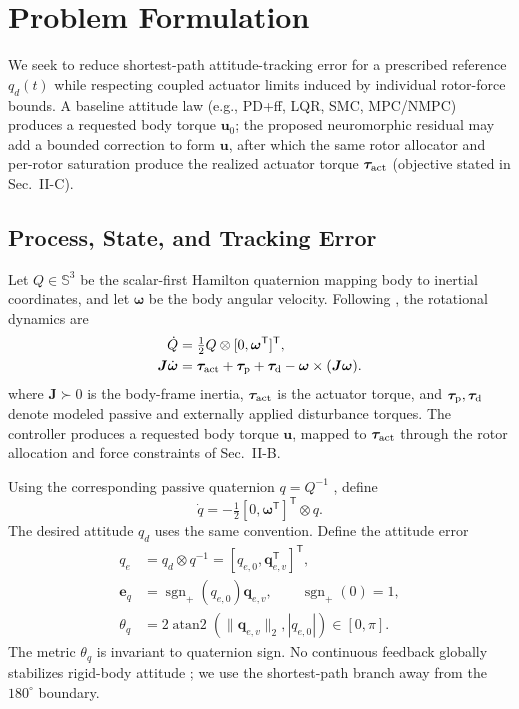 \documentclass[letterpaper, 10 pt, conference]{ieeeconf}
\newcommand{\T}{^{\mathsf T}}
\newcommand{\sgnp}{\operatorname{sgn}_{+}}
\begin{document}
\section{Problem Formulation}
\label{sec:problem}
We seek to reduce shortest-path attitude-tracking error for a prescribed reference $q_d(t)$ while respecting coupled actuator limits induced by individual rotor-force bounds. A baseline attitude law (e.g., PD+ff, LQR, SMC, MPC/NMPC) produces a requested body torque $\bm u_0$; the proposed neuromorphic residual may add a bounded correction to form $\bm u$, after which the same rotor allocator and per-rotor saturation produce the realized actuator torque $\bm\tau_{\rm act}$ (objective stated in Sec.~II-C).

\subsection{Process, State, and Tracking Error}

Let $Q\in\mathbb S^3$ be the scalar-first Hamilton quaternion mapping body to
inertial coordinates, and let $\bm\omega$ be the body angular velocity. Following \cite{schaub2018amss}, the
rotational dynamics are
\begin{align}
 \dot Q&=\tfrac12 Q\otimes[0,\bm\omega\T]\T,\\
 \bm J\dot{\bm\omega}&=\bm\tau_{\rm act}+\bm\tau_{\rm p}
       +\bm\tau_{\rm d}-\bm\omega\times(\bm J\bm\omega).
 \label{eq:plant}
\end{align}
where $\bm J\succ0$ is the body-frame inertia, $\bm\tau_{\rm act}$ is the actuator torque, and $\bm\tau_{\rm p},\bm\tau_{\rm d}$ denote modeled passive and externally applied disturbance torques. The controller produces a requested body torque $\bm u$, mapped to $\bm\tau_{\rm act}$ through the rotor allocation and force constraints of Sec.~II-B.

Using the corresponding passive quaternion $q=Q^{-1}$ \cite{diebel2006quaternion}, define
\begin{equation}
 \dot q=-\tfrac12[0,\bm\omega\T]\T\otimes q.
 \label{eq:passive}
\end{equation}
The desired attitude $q_d$ uses the same convention. Define the attitude error
\begin{align}
 q_e&=q_d\otimes q^{-1}=[q_{e,0},\bm q_{e,v}\T]\T,\\
 \bm e_q&=\sgnp(q_{e,0})\bm q_{e,v},\qquad \sgnp(0)=1,\\
 \theta_q&=2\operatorname{atan2}(\|\bm q_{e,v}\|_2,|q_{e,0}|)
             \in[0,\pi].
 \label{eq:theta}
\end{align}
The metric $\theta_q$ is invariant to quaternion sign. No continuous feedback globally stabilizes rigid-body attitude \cite{chaturvedi2011rigid}; we use the shortest-path branch away from the $180^\circ$ boundary.
\end{document}
